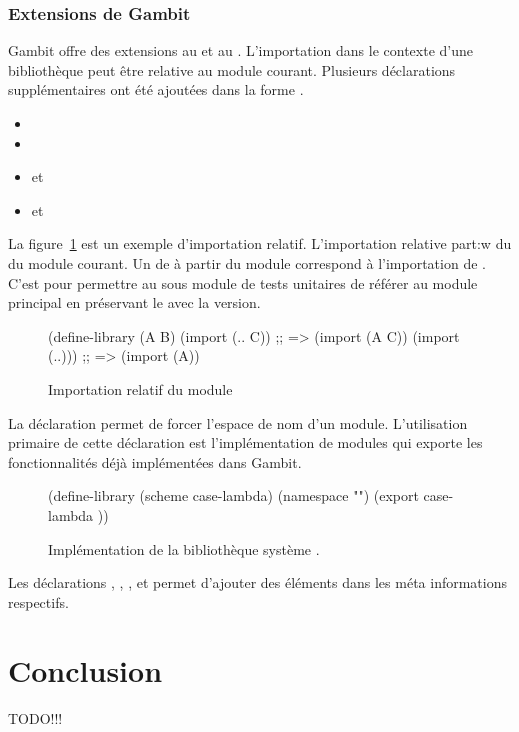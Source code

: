 \subsubsection{Extensions de Gambit}

Gambit offre des extensions au  et au .
L'importation dans le contexte d'une bibliothèque peut être relative au module
courant. Plusieurs déclarations supplémentaires ont été ajoutées dans la forme
.

\begin{itemize}
  \item {}
  \item {}
  \item {} et 
  \item {} et 
\end{itemize}


La figure~\ref{fig:relative-import} est un exemple d'importation
relatif.  L'importation relative part:w
du  du module courant.
Un  de  à partir du module 
correspond à l'importation de . C'est pour permettre au sous
module de tests unitaires de référer au module principal en préservant le
 avec la version. \\

\begin{figure}[ht]
  \centering
  \begin{mplisting}{0.8}
(define-library (A B)
  (import (.. C))  ;; => (import (A C))
  (import (..))) ;; => (import (A))
\end{mplisting}
  \caption{Importation relatif du module }
  \label{fig:relative-import}
\end{figure}

La déclaration  permet de forcer l'espace de nom d'un module.
L'utilisation primaire de cette déclaration est l'implémentation de modules qui
exporte les fonctionnalités déjà implémentées dans Gambit. \\

\begin{figure}
  \begin{mplisting}{0.8}
(define-library (scheme case-lambda)
  (namespace "")
  (export
case-lambda
))
\end{mplisting}
  \caption{Implémentation de la bibliothèque système .}
  \label{fig:module->scheme/case-lambda}
\end{figure}

Les déclarations , , ,
 et  permet d'ajouter des éléments dans les
méta informations respectifs.

\section{Conclusion}

TODO!!!

